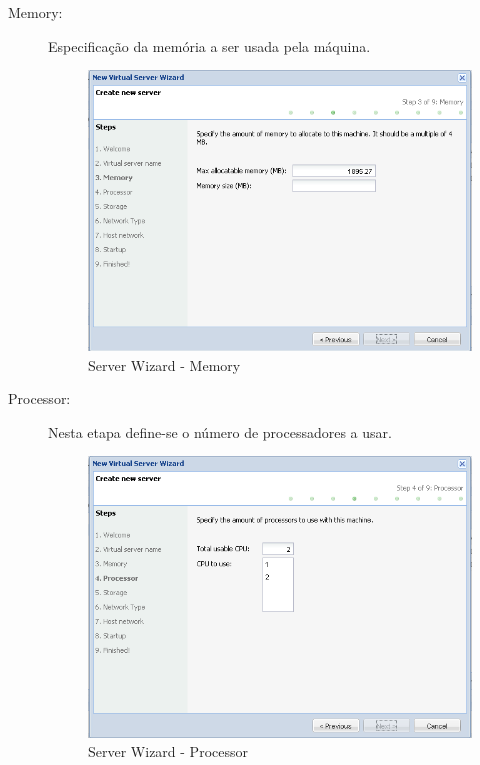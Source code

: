 \begin{description}
	\item[Memory:] Especificação da memória a ser usada pela máquina.
		\begin{figure}[H]
        		\begin{center}
		        \includegraphics[scale=0.5]{screenshots/server_createwiz_memory.png}
        		\caption{Server Wizard - Memory}
	        	\label{fig:server_createwiz_memory}
	        	\end{center}
		\end{figure}

	\item[Processor:] Nesta etapa define-se o número de processadores a usar.
		\begin{figure}[H]
        		\begin{center}
		        \includegraphics[scale=0.5]{screenshots/server_createwiz_processor.png}
        		\caption{Server Wizard - Processor}
		        \label{fig:server_createwiz_processor}
	        	\end{center}
		\end{figure}


\end{description}
